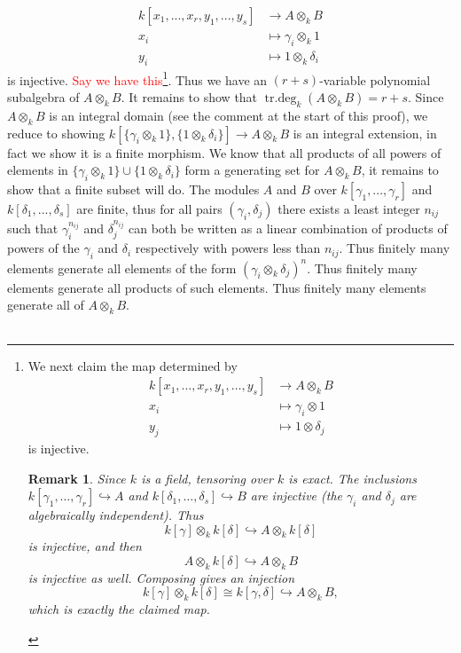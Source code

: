 \documentclass[12pt]{article}
\numberwithin{thm}{subsection}
\numberwithin{defn}{subsection}
\numberwithin{lemma}{subsection}
\numberwithin{example}{subsection}
\numberwithin{notation}{subsection}
\numberwithin{cor}{subsection}
\newtheorem{remark}{Remark}
\numberwithin{remark}{subsection}
\numberwithin{condition}{subsection}
\numberwithin{question}{subsection}
\numberwithin{construction}{subsection}
\numberwithin{construction}{subsection}
\numberwithin{construction}{subsection}
\newcommand{\lto}{\longrightarrow}
\begin{document}
\begin{align*}
    k[x_1,...,x_r,y_1,...,y_s] &\lto A\otimes_k B\\
    x_i &\mapsto \gamma_i \otimes_k 1\\
    y_i &\mapsto 1 \otimes_k \delta_i
\end{align*}
is injective. \textcolor{red}{Say we have this}\footnote{We next claim the map determined by
\begin{align*}
    k[x_1,\dots,x_r,y_1,\dots,y_s] &\lto A\otimes_k B\\
    x_i &\mapsto \gamma_i \otimes 1\\
    y_j &\mapsto 1 \otimes \delta_j
\end{align*}
is injective.

\begin{remark}
Since $k$ is a field, tensoring over $k$ is exact. The inclusions
$k[\gamma_1,\dots,\gamma_r]\hookrightarrow A$ and $k[\delta_1,\dots,\delta_s]\hookrightarrow B$
are injective (the $\gamma_i$ and $\delta_j$ are algebraically independent).
Thus
\[
k[\gamma]\otimes_k k[\delta]\hookrightarrow A\otimes_k k[\delta]
\]
is injective, and then
\[
A\otimes_k k[\delta]\hookrightarrow A\otimes_k B
\]
is injective as well. Composing gives an injection
\[
k[\gamma]\otimes_k k[\delta]\cong k[\gamma,\delta]\hookrightarrow A\otimes_k B,
\]
which is exactly the claimed map.
\end{remark}}. Thus we have an $(r + s)$-variable polynomial subalgebra of $A\otimes_k B$. It remains to show that $\operatorname{tr.deg}_k(A\otimes_kB) = r + s$. Since $A\otimes_k B$ is an integral domain (see the comment at the start of this proof), we reduce to showing $k[\lbrace \gamma_i \otimes_k 1\rbrace, \lbrace 1 \otimes_k \delta_i\rbrace]\lto A\otimes_k B$ is an integral extension, in fact we show it is a finite morphism. We know that all products of all powers of elements in $\lbrace \gamma_i \otimes_k 1\rbrace \cup \lbrace 1 \otimes_k \delta_i\rbrace$ form a generating set for $A\otimes_k B$, it remains to show that a finite subset will do. The modules $A$ and $B$ over $k[\gamma_1,...,\gamma_r]$ and $k[\delta_1,...,\delta_s]$ are finite, thus for all pairs $(\gamma_i, \delta_j)$ there exists a least integer $n_{ij}$ such that $\gamma_i^{n_{ij}}$ and $\delta_j^{n_{ij}}$ can both be written as a linear combination of products of powers of the $\gamma_i$ and $\delta_i$ respectively with powers less than $n_{ij}$. Thus finitely many elements generate all elements of the form $(\gamma_i \otimes_k \delta_j)^n$. Thus finitely many elements generate all products of such elements. Thus finitely many elements generate all of $A \otimes_k B$.\\\\
\end{document}

